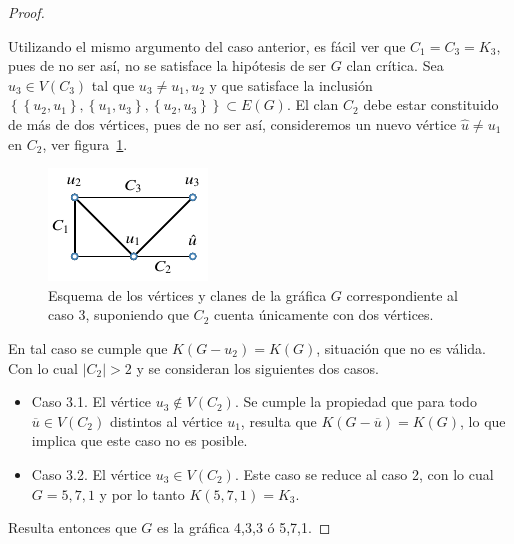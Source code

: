 \documentclass[12pt]{book}
\theoremstyle{definition}
\begin{document}
\begin{proof}
\begin{itemize}
Utilizando el mismo argumento del caso anterior, es fácil ver que $C_1= C_3=K_3$, pues de no ser así, no se satisface la hipótesis de ser $G$ clan crítica. Sea $u_3\in V(C_3)$ tal que $u_3\neq u_1,u_2$ y que satisface la inclusión $\left\{\left\{u_2,u_1\right\},\left\{u_1,u_3\right\},\left\{u_2,u_3\right\}\right\}\subset E(G)$. El clan $C_2$ debe estar constituido de más de dos vértices, pues de no ser así, consideremos un nuevo vértice $\hat{u}\neq u_1$ en $C_2$, ver figura~\ref{F4}.

\begin{figure}[!htbp]
	\centering
	\includegraphics[scale=1.2]{Fig4.pdf}
	\caption{Esquema de los vértices y clanes de la gráfica $G$ correspondiente al caso 3, suponiendo que $C_2$ cuenta únicamente con dos vértices.\label{F4}}
\end{figure}

En tal caso se cumple que $K(G-u_2)=K(G)$, situación que no es válida. Con lo cual $|C_2|>2$ y se consideran los siguientes dos casos.
\begin{itemize}
\item Caso 3.1.
El vértice $u_3\notin V(C_2)$. Se cumple la propiedad que para todo $\overline{u}\in V(C_2)$ distintos al vértice $u_1$, resulta que $K(G-\overline{u})=K(G)$, lo que implica que este caso no es posible.

\item Caso 3.2.
El vértice $u_3\in V(C_2)$. Este caso se reduce al caso 2, con lo cual $G=5,7,1$ y por lo tanto $K(5,7,1)=K_3$.
\end{itemize}
\end{itemize}
Resulta entonces que $G$ es la gráfica 4,3,3 ó 5,7,1.
\end{proof}







\end{document}
